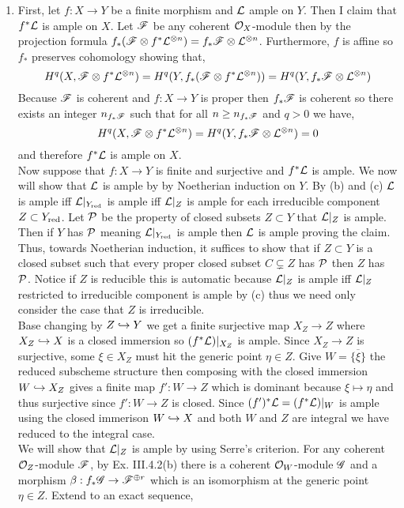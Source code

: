 \documentclass[12pt]{article}
\begin{document}
\begin{enumerate}
\item First, let $f : X \to Y$ be a finite morphism and $\mathcal{L}$ ample on $Y$. Then I claim that $f^* \mathcal{L}$ is ample on $X$. Let $\mathscr{F}$ be any coherent $\mathcal{O}_{X}$-module then by the projection formula $f_* (\mathscr{F} \otimes f^* \mathcal{L}^{\otimes n}) = f_* \mathscr{F} \otimes \mathcal{L}^{\otimes n}$. Furthermore, $f$ is affine so $f_*$ preserves cohomology showing that,
\[ H^q(X, \mathscr{F} \otimes f^* \mathcal{L}^{\otimes n}) = H^q(Y, f_*(\mathscr{F} \otimes f^* \mathcal{L}^{\otimes n})) = H^q(Y, f_* \mathscr{F} \otimes \mathcal{L}^{\otimes n}) \]
Because $\mathscr{F}$ is coherent and $f : X \to Y$ is proper then $f_* \mathscr{F}$ is coherent so there exists an integer $n_{f_* \mathscr{F}}$ such that for all $n \ge n_{f_* \mathscr{F}}$ and $q > 0$ we have,
\[ H^q(X, \mathscr{F} \otimes f^* \mathcal{L}^{\otimes n}) = H^q(Y, f_* \mathscr{F} \otimes \mathcal{L}^{\otimes n}) = 0 \]
and therefore $f^* \mathcal{L}$ is ample on $X$. 
\bigskip\\
Now suppose that $f : X \to Y$ is finite and surjective and $f^* \mathcal{L}$ is ample. We now will show that $\mathcal{L}$ is ample by by Noetherian induction on $Y$. By (b) and (c) $\mathcal{L}$ is ample iff $\mathcal{L}|_{Y_{\mathrm{red}}}$ is ample iff $\mathcal{L}|_{Z}$ is ample for each irreducible component $Z \subset Y_{\mathrm{red}}$. Let $\mathcal{P}$ be the property of closed subsets $Z \subset Y$ that $\mathcal{L}|_Z$ is ample. Then if $Y$ has $\mathcal{P}$ meaning $\mathcal{L}|_{Y_{\mathrm{red}}}$ is ample then $\mathcal{L}$ is ample proving the claim. Thus, towards Noetherian induction, it suffices to show that if $Z \subset Y$ is a closed subset such that every proper closed subset $C \subsetneq Z$ has $\mathcal{P}$ then $Z$ has $\mathcal{P}$. Notice if $Z$ is reducible this is automatic because $\mathcal{L}|_Z$ is ample iff $\mathcal{L}|_Z$ restricted to irreducible component is ample by (c) thus we need only consider the case that $Z$ is irreducible.
\bigskip\\
Base changing by $Z \hookrightarrow Y$ we get a finite surjective map $X_Z \to Z$ where $X_Z \hookrightarrow X$ is a closed immersion so $(f^* \mathcal{L})|_{X_Z}$ is ample. Since $X_Z \to Z$ is surjective, some $\xi \in X_Z$ must hit the generic point $\eta \in Z$. Give $W = \overline{\{ \xi \}}$ the reduced subscheme structure then composing with the closed immersion $W \hookrightarrow X_Z$ gives a finite map $f' : W \to Z$ which is dominant because $\xi \mapsto \eta$ and thus surjective since $f' : W \to Z$ is closed. Since $(f')^* \mathcal{L} = (f^* \mathcal{L})|_W$ is ample using the closed immerison $W \hookrightarrow X$ and both $W$ and $Z$ are integral we have reduced to the integral case.
\bigskip\\
We will show that $\mathcal{L}|_Z$ is ample by using Serre's criterion. For any coherent $\mathcal{O}_{Z}$-module $\mathscr{F}$, by Ex. III.4.2(b) there is a coherent $\mathcal{O}_{W}$-module $\mathscr{G}$ and a morphism $\beta : f_* \mathscr{G} \to \mathscr{F}^{\oplus r}$ which is an isomorphism at the generic point $\eta \in Z$. Extend to an exact sequence,

\end{enumerate}
\end{document}
